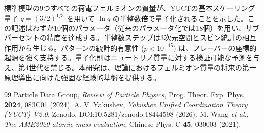 \documentclass[12pt,a4paper]{article}
\begin{document}
	標準模型の9つすべての荷電フェルミオンの質量が、YUCTの基本スケーリング量子 \(q = (3/2)^{1/3}\) を用いて \(\ln q\) の半整数倍で量子化されることを示した。この記述はわずか10個のパラメータ（従来のパラメータ化では18個）を用い、サブパーセントの精度を達成する。半整数ステップは3次元空間とスピン統計の相互作用から生じる。パターンの統計的有意性 (\(p < 10^{-15}\)) は、フレーバーの座標的起源を強く支持する。量子化則はニュートリノ質量に対する検証可能な予測を与え、第4世代を禁じる。本研究は、理論におけるフェルミオン質量の将来の第一原理導出に向けた強固な経験的基盤を提供する。
	
	\begin{thebibliography}{99}
		 Particle Data Group, \textit{Review of Particle Physics}, Prog. Theor. Exp. Phys. \textbf{2024}, 083C01 (2024).
		 A. V. Yakushev, \textit{Yakushev Unified Coordination Theory (YUCT) V2.0}, Zenodo, DOI:10.5281/zenodo.18444598 (2026).
		 M. Wang \textit{et al.}, \textit{The AME2020 atomic mass evaluation}, Chinese Phys. C \textbf{45}, 030003 (2021).
	\end{thebibliography}
	
\end{document}

